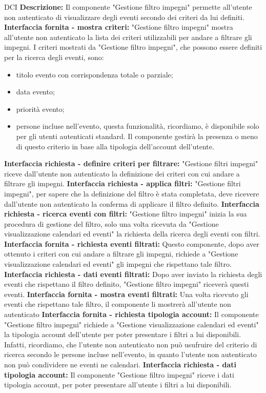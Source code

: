 \begin{listaPersonale}{DCI}
    \textbf{Descrizione:} Il componente "Gestione filtro impegni" permette all'utente non autenticato di visualizzare degli eventi secondo dei criteri da lui definiti.
    \textbf{Interfaccia fornita - mostra criteri:} "Gestione filtro impegni" mostra all'utente non autenticato la lista dei criteri utilizzabili per andare a filtrare gli impegni.
    I criteri mostrati da "Gestione filtro impegni", che possono essere definiti per la ricerca degli eventi, sono:
    \begin{itemize}
        \item titolo evento con corrispondenza totale o parziale;
        \item data evento;
        \item priorità evento;
        \item persone incluse nell'evento, questa funzionalità, ricordiamo, è disponibile solo per gli utenti autenticati standard. Il componente gestirà la presenza o meno di questo criterio in base alla tipologia dell'account dell'utente.
    \end{itemize}
    \textbf{Interfaccia richiesta - definire criteri per filtrare:} "Gestione filtri impegni" riceve dall'utente non autenticato la definizione dei criteri con cui andare a filtrare gli impegni.
    \textbf{Interfaccia richiesta - applica filtri:} "Gestione filtri impegni", per sapere che la definizione del filtro è stata completata, deve ricevere dall'utente non autenticato la conferma di applicare il filtro definito.
    \textbf{Interfaccia richiesta - ricerca eventi con filtri:} "Gestione filtro impegni" inizia la sua procedura di gestione del filtro, solo una volta ricevuta da "Gestione visualizzazione calendari ed eventi" la richiesta della ricerca degli eventi con filtri.
    \textbf{Interfaccia fornita - richiesta eventi filtrati:} Questo componente, dopo aver ottenuto i criteri con cui andare a filtrare gli impegni, richiede a "Gestione visualizzazione calendari ed eventi" gli impegni che rispettano tale filtro.
    \textbf{Interfaccia richiesta - dati eventi filtrati:} Dopo aver inviato la richiesta degli eventi che rispettano il filtro definito, "Gestione filtro impegni" riceverà questi eventi.
    \textbf{Interfaccia fornita - mostra eventi filtrati:} Una volta ricevuto gli eventi che rispettano tale filtro, il componente li mostrerà all'utente non autenticato
    \textbf{Interfaccia fornita - richiesta tipologia account:} Il componente "Gestione filtro impegni" richiede a "Gestione visualizzazione calendari ed eventi"  la tipologia account dell'utente per poter presentare i filtri a lui disponibili. Infatti, ricordiamo, che l'utente non autenticato non può usufruire del criterio di ricerca secondo le persone incluse nell'evento, in quanto l'utente non autenticato non può condividere ne eventi ne calendari.
    \textbf{Interfaccia richiesta - dati tipologia account:} Il componente "Gestione filtro impegni" riceve i dati tipologia account, per poter presentare all'utente i filtri a lui disponibili.



\end{listaPersonale}

